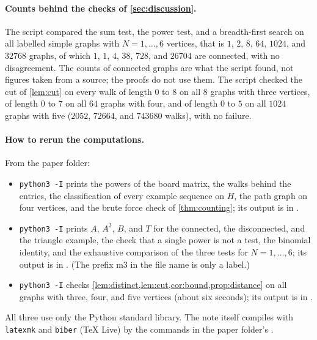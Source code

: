 \paragraph{Counts behind the checks of \cref{sec:discussion}.} The script
 compared the sum test, the power test, and
a breadth-first search on all labelled simple graphs with $N=1,\dots,6$
vertices, that is $1$, $2$, $8$, $64$, $1024$, and $32768$ graphs, of which
$1$, $1$, $4$, $38$, $728$, and $26704$ are connected, with no
disagreement. The counts of connected graphs are what the script found, not
figures taken from a source; the proofs do not use them. The script 
checked the cut of \cref{lem:cut} on every walk of length $0$ to $8$ on all
$8$ graphs with three vertices, of length $0$ to $7$ on all $64$ graphs with
four, and of length $0$ to $5$ on all $1024$ graphs with five ($2052$,
$72664$, and $743680$ walks), with no failure.

\paragraph{How to rerun the computations.} From the paper folder:
\begin{itemize}
\item \texttt{python3 -I}  prints the powers of the
  board matrix, the walks behind the entries, the classification of every
  example sequence on $H$, the path graph on four vertices, and the brute
  force check of \cref{thm:counting}; its output is in
  .
\item \texttt{python3 -I}  prints $A$, $A^2$,
  $B$, and $T$ for the connected, the disconnected, and the triangle
  example, the check that a single power is not a test, the binomial
  identity, and the exhaustive comparison of the three tests for
  $N=1,\dots,6$; its output is in . (The prefix m3 in the file name is only a label.)
\item \texttt{python3 -I}  checks
  \cref{lem:distinct,lem:cut,cor:bound,prop:distance} on all graphs with three,
  four, and five vertices (about six seconds); its output is in
  .
\end{itemize}
All three use only the Python standard library. The note itself compiles
with \texttt{latexmk} and \texttt{biber} (TeX Live) by the commands in the
paper folder's .
